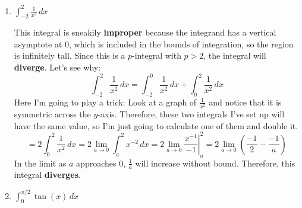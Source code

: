 \begin{enumerate}[leftmargin=0pt]
\begin{enumerate}
    \begin{red}
    This integral is \textbf{improper} because it is infinitely tall: the integrand has a vertical asymptote at $x=4$, which is included in the bounds of integration. I'm pretty sure this is going to \textbf{converge} because the power is $1/2 < 1$, but in order to figure out what it converges to, we'll need to do a substitution $u = 4-x$, $du = -dx$:
    \begin{align*}
        \int_1^4 \frac{1}{\sqrt{4-x}} \, dx &= \lim_{b\to 4}\int_1^b \frac{1}{\sqrt{4-x}}\, dx \\
        &= \lim_{b\to 4}\int_{x=1}^{x=b} \frac{1}{\sqrt{u}}\, (-du) 
        = -\lim_{b\to 4}\int_{x=1}^{x=b} u^{-1/2}\, du \\
        &= -\lim_{b\to 4}\left[ \frac{u^{1/2}}{1/2} \right|_{x=1}^{x=b}
        \intertext{Now we back-substitute before plugging in the bounds of integration so that we do not make a puppy cry:}
        &= -\lim_{b\to 4}\left[ \frac{(4-x)^{1/2}}{1/2} \right|_1^b 
        = -\lim_{b\to 4}\left[ \frac{(4-b)^{1/2}}{1/2} - \frac{3^{1/2}}{1/2} \right]
        = -(0 - 2\sqrt{3}) \\
        &= 2\sqrt{3}.
    \end{align*}
    \end{red}
    
    \pagebreak
    
    \item $\displaystyle \int_{-2}^2 \frac{1}{x^2} \, dx$
    
    \begin{red}
    This integral is sneakily \textbf{improper} because the integrand has a vertical asymptote at 0, which is included in the bounds of integration, so the region is infinitely tall. Since this is a $p$-integral with $p > 2$, the integral will \textbf{diverge}. Let's see why:
    \[\int_{-2}^2 \frac{1}{x^2}\, dx = \int_{-2}^0 \frac{1}{x^2}\, dx + \int_0^2 \frac{1}{x^2}\, dx\]
    Here I'm going to play a trick: Look at a graph of $\frac{1}{x^2}$ and notice that it is symmetric across the $y$-axis. Therefore, these two integrals I've set up will have the same value, so I'm just going to calculate one of them and double it.
    \[ = 2\int_0^2 \frac{1}{x^2}\, dx = 2\lim_{a\to 0} \int_a^2 x^{-2}\, dx = 2\lim_{a\to 0} \left.\frac{x^{-1}}{-1} \right|_a^2 = 2\lim_{a \to 0}\left(\frac{-1}{2} - \frac{-1}{a}\right) \]
    In the limit as $a$ approaches 0, $\frac{1}{a}$ will increase without bound. Therefore, this integral \textbf{diverges}. 
    \end{red}
    \item $\displaystyle \int_0^{\pi/2} \tan(x) \, dx$
    

\end{enumerate}
\end{enumerate}
